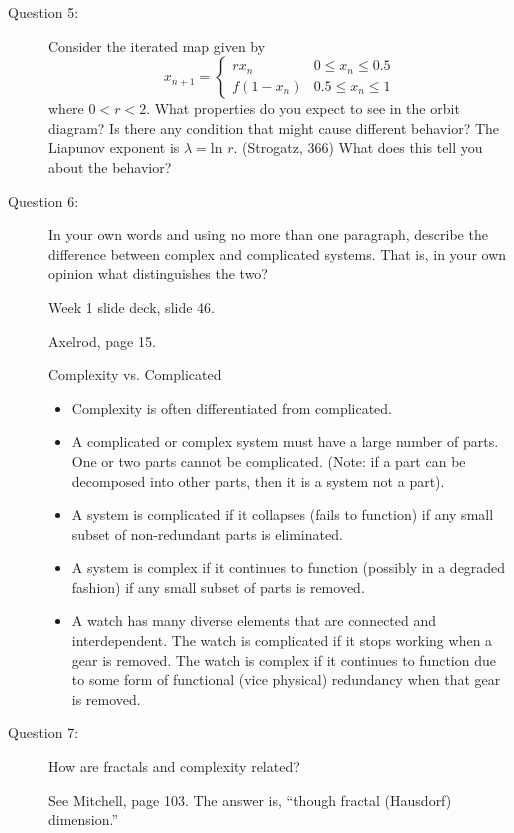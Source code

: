 \documentclass[letterpaper,10pt]{article}
\begin{document}
\begin{description}
\item[Question 5:]
Consider the iterated map given by
\[x_{n+1} = \left\{
  \begin{array}{lr}
    rx_n &  0\le x_n \le 0.5 \\
    f(1-x_n) &  0.5\le x_n \le 1
  \end{array}
\right.
\]
where $0<r<2$.  What properties do you expect to see in the orbit diagram?  Is there any condition that might cause different behavior?  The Liapunov exponent is $\lambda=\mbox{ln\ }r$. (Strogatz, 366)  What does this tell you about the behavior?


\item[Question 6:]
  In your own words and using no more than one paragraph, describe the difference between complex and complicated systems.  That is, in your own opinion what distinguishes the two?

Week 1 slide deck, slide 46.

Axelrod, page 15.

Complexity vs. Complicated
\begin{itemize}
  \item Complexity is often differentiated from complicated.
  \item A complicated or complex system must have a large number of parts.  One or two parts cannot be complicated.  (Note: if a part can be decomposed into other parts, then it is a system not a part).
  \item A system is complicated if it collapses (fails to function) if any small subset of non-redundant parts is eliminated.
  \item A system is complex if it continues to function (possibly in a degraded fashion) if any small subset of parts is removed.
  \item A watch has many diverse elements that are connected and interdependent.  The watch is complicated if it stops working when a gear is removed.  The watch is complex if it continues to function due to some form of functional (vice physical) redundancy when that gear is removed.
\end{itemize}


\item[Question 7:]
How are fractals and complexity related?

See Mitchell, page 103.  The answer is, ``though fractal (Hausdorf) dimension.''


\end{description}
\end{document}
